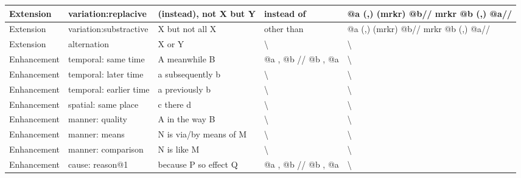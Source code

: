\begin{landscape}
\begin{longtable}{|l|l|p{3cm}|p{5cm}|p{5cm}|}
			Extension   & variation:replacive    & (instead), not X but Y               & instead of                                                              & @a (,) (mrkr) @b// mrkr @b (,) @a//            \\ \hline
			Extension   & variation:substractive & X but not all X                      & other than                                                              & @a (,) (mrkr) @b// mrkr @b (,) @a//            \\ \hline
			Extension   & alternation            & X or Y                               & \textbackslash                                                          & \textbackslash                                 \\ \hline
			Enhancement & temporal: same time    & A meanwhile B                        & @a , @b // @b , @a                                                      & \textbackslash                                 \\ \hline
			Enhancement & temporal: later time   & a subsequently b                     & \textbackslash                                                          & \textbackslash                                 \\ \hline
			Enhancement & temporal: earlier time & a previously b                       & \textbackslash                                                          & \textbackslash                                 \\ \hline
			Enhancement & spatial: same place    & c there d                            & \textbackslash                                                          & \textbackslash                                 \\ \hline
			Enhancement & manner: quality        & A in the way B                       & \textbackslash                                                          & \textbackslash                                 \\ \hline
			Enhancement & manner: means          & N is via/by means of M               & \textbackslash                                                          & \textbackslash                                 \\ \hline
			Enhancement & manner: comparison     & N is like M                          & \textbackslash                                                          & \textbackslash                                 \\ \hline
			Enhancement & cause: reason@1        & because P so effect Q                & @a , @b // @b , @a                                                      & \textbackslash                                 \\ \hline

\end{longtable}
\end{landscape}
